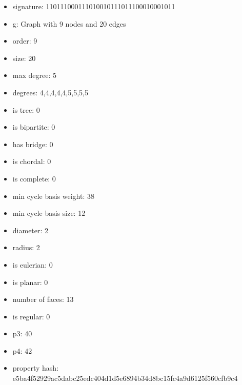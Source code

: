 \newpage
\begin{figure}
\end{figure}
\begin{itemize}
\item signature: 110111000111010010111011100010001011
\item g: Graph with 9 nodes and 20 edges
\item order: 9
\item size: 20
\item max degree: 5
\item degrees: 4,4,4,4,4,5,5,5,5
\item is tree: 0
\item is bipartite: 0
\item has bridge: 0
\item is chordal: 0
\item is complete: 0
\item min cycle basis weight: 38
\item min cycle basis size: 12
\item diameter: 2
\item radius: 2
\item is eulerian: 0
\item is planar: 0
\item number of faces: 13
\item is regular: 0
\item p3: 40
\item p4: 42
\item property hash: e5ba4f52929ac5dabc25edc404d1d5e6894b34d8bc15fc4a9d6125f560cfb9c4
\end{itemize}
